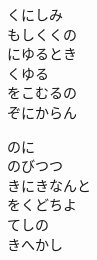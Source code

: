 \documentclass[10pt,b5j]{tarticle} %
\begin{document}
\begin{enumerate}
\begin{minipage}[c]{\blocksize}
        \vspace{\linespace}
        \item
        くにしみ\\
        もしくくの\\
        にゆるとき\\
        くゆる\\
        をこむるの\\
        ぞにからん
        
        \vspace{\linespace}
        \item
        のに\\
        のびつつ\\
        きにきなんと\\
        をくどちよ\\
        てしの\\
        きへかし
    
    \end{minipage}
\end{enumerate} %
\end{document}
